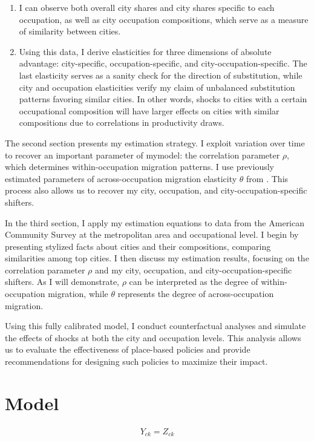 \documentclass[10pt]{article}
\begin{document}
\begin{enumerate}
    \item I can observe both overall city shares and city shares specific to each occupation, as well as city occupation compositions, which serve as a measure of similarity between cities.
    \item Using this data, I derive elasticities for three dimensions of absolute advantage: city-specific, occupation-specific, and city-occupation-specific. The last elasticity serves as a sanity check for the direction of substitution, while city and occupation elasticities verify my claim of unbalanced substitution patterns favoring similar cities. In other words, shocks to cities with a certain occupational composition will have larger effects on cities with similar compositions due to correlations in productivity draws.
\end{enumerate}

The second section presents my estimation strategy. I exploit variation over time to recover an important parameter of mymodel: the correlation parameter $\rho$, which determines within-occupation migration patterns. I use previously estimated parameters of across-occupation migration elasticity $\theta$ from \cite{redding}. This process also allows us to recover my city, occupation, and city-occupation-specific shifters.

In the third section, I apply my estimation equations to data from the American Community Survey at the metropolitan area and occupational level. I begin by presenting stylized facts about cities and their compositions, comparing similarities among top cities. I then discuss my estimation results, focusing on the correlation parameter $\rho$ and my city, occupation, and city-occupation-specific shifters. As I will demonstrate, $\rho$ can be interpreted as the degree of within-occupation migration, while $\theta$ represents the degree of across-occupation migration.

Using this fully calibrated model, I conduct counterfactual analyses and simulate the effects of shocks at both the city and occupation levels. This analysis allows us to evaluate the effectiveness of place-based policies and provide recommendations for designing such policies to maximize their impact.

\section{Model}

\begin{align*}
    Y_{ck} = Z_{ck}
\end{align*}
\end{document}
